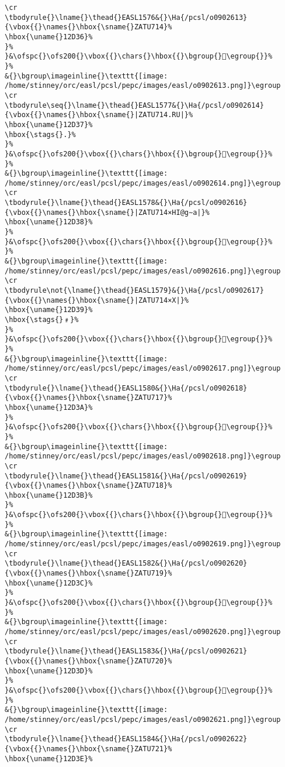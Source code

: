 \begin{verbatim}
\cr
\tbodyrule{}\lname{}\thead{}EASL1576&{}\Ha{/pcsl/o0902613}{\vbox{{}\names{}\hbox{\sname{}ZATU714}%
\hbox{\uname{}12D36}%
}%
}&\ofspc{}\ofs200{}\vbox{{}\chars{}\hbox{{}\bgroup{}𒴶\egroup{}}%
}%
&{}\bgroup\imageinline{}\texttt{[image: /home/stinney/orc/easl/pcsl/pepc/images/easl/o0902613.png]}\egroup
\cr
\tbodyrule\seq{}\lname{}\thead{}EASL1577&{}\Ha{/pcsl/o0902614}{\vbox{{}\names{}\hbox{\sname{}|ZATU714.RU|}%
\hbox{\uname{}12D37}%
\hbox{\stags{}.}%
}%
}&\ofspc{}\ofs200{}\vbox{{}\chars{}\hbox{{}\bgroup{}𒴷\egroup{}}%
}%
&{}\bgroup\imageinline{}\texttt{[image: /home/stinney/orc/easl/pcsl/pepc/images/easl/o0902614.png]}\egroup
\cr
\tbodyrule{}\lname{}\thead{}EASL1578&{}\Ha{/pcsl/o0902616}{\vbox{{}\names{}\hbox{\sname{}|ZATU714×HI@g∼a|}%
\hbox{\uname{}12D38}%
}%
}&\ofspc{}\ofs200{}\vbox{{}\chars{}\hbox{{}\bgroup{}𒴸\egroup{}}%
}%
&{}\bgroup\imageinline{}\texttt{[image: /home/stinney/orc/easl/pcsl/pepc/images/easl/o0902616.png]}\egroup
\cr
\tbodyrule\not{\lname{}\thead{}EASL1579}&{}\Ha{/pcsl/o0902617}{\vbox{{}\names{}\hbox{\sname{}|ZATU714×X|}%
\hbox{\uname{}12D39}%
\hbox{\stags{}﹟}%
}%
}&\ofspc{}\ofs200{}\vbox{{}\chars{}\hbox{{}\bgroup{}𒴹\egroup{}}%
}%
&{}\bgroup\imageinline{}\texttt{[image: /home/stinney/orc/easl/pcsl/pepc/images/easl/o0902617.png]}\egroup
\cr
\tbodyrule{}\lname{}\thead{}EASL1580&{}\Ha{/pcsl/o0902618}{\vbox{{}\names{}\hbox{\sname{}ZATU717}%
\hbox{\uname{}12D3A}%
}%
}&\ofspc{}\ofs200{}\vbox{{}\chars{}\hbox{{}\bgroup{}𒴺\egroup{}}%
}%
&{}\bgroup\imageinline{}\texttt{[image: /home/stinney/orc/easl/pcsl/pepc/images/easl/o0902618.png]}\egroup
\cr
\tbodyrule{}\lname{}\thead{}EASL1581&{}\Ha{/pcsl/o0902619}{\vbox{{}\names{}\hbox{\sname{}ZATU718}%
\hbox{\uname{}12D3B}%
}%
}&\ofspc{}\ofs200{}\vbox{{}\chars{}\hbox{{}\bgroup{}𒴻\egroup{}}%
}%
&{}\bgroup\imageinline{}\texttt{[image: /home/stinney/orc/easl/pcsl/pepc/images/easl/o0902619.png]}\egroup
\cr
\tbodyrule{}\lname{}\thead{}EASL1582&{}\Ha{/pcsl/o0902620}{\vbox{{}\names{}\hbox{\sname{}ZATU719}%
\hbox{\uname{}12D3C}%
}%
}&\ofspc{}\ofs200{}\vbox{{}\chars{}\hbox{{}\bgroup{}𒴼\egroup{}}%
}%
&{}\bgroup\imageinline{}\texttt{[image: /home/stinney/orc/easl/pcsl/pepc/images/easl/o0902620.png]}\egroup
\cr
\tbodyrule{}\lname{}\thead{}EASL1583&{}\Ha{/pcsl/o0902621}{\vbox{{}\names{}\hbox{\sname{}ZATU720}%
\hbox{\uname{}12D3D}%
}%
}&\ofspc{}\ofs200{}\vbox{{}\chars{}\hbox{{}\bgroup{}𒴽\egroup{}}%
}%
&{}\bgroup\imageinline{}\texttt{[image: /home/stinney/orc/easl/pcsl/pepc/images/easl/o0902621.png]}\egroup
\cr
\tbodyrule{}\lname{}\thead{}EASL1584&{}\Ha{/pcsl/o0902622}{\vbox{{}\names{}\hbox{\sname{}ZATU721}%
\hbox{\uname{}12D3E}%

\end{verbatim}
